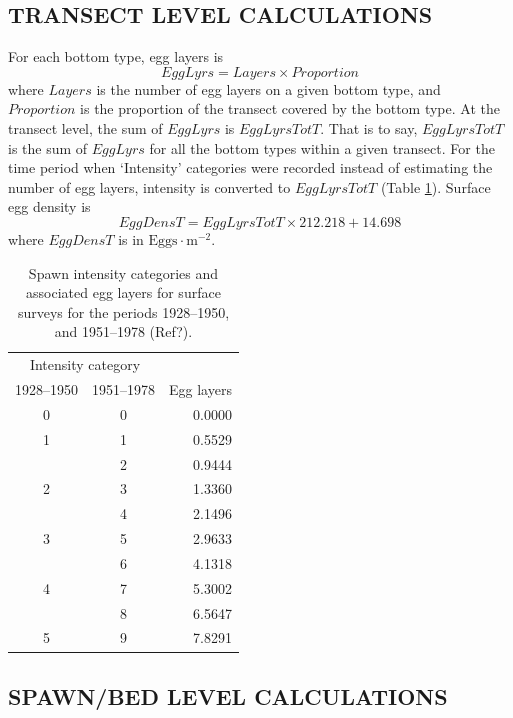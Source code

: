 \documentclass[12pt]{article}
\begin{document}
\subsection{TRANSECT LEVEL CALCULATIONS}

For each bottom type, egg layers is
\begin{equation}
EggLyrs = Layers \times Proportion
\label{eqEggLayersSurf}
\end{equation}
where $Layers$ is the number of egg layers on a given bottom type, and $Proportion$ is the proportion of the transect covered by the bottom type.
At the transect level, the sum of $EggLyrs$ is $EggLyrsTotT$.
That is to say, $EggLyrsTotT$ is the sum of $EggLyrs$ for all the bottom types within a given transect.
For the time period when `Intensity' categories were recorded instead of estimating the number of egg layers, intensity is converted to $EggLyrsTotT$ (Table \ref{tabIntensity}).
Surface egg density is \citep{SchweigertEtal1997}
\begin{equation}
EggDensT = EggLyrsTotT \times 212.218 + 14.698
\label{eqEggDensSurf}
\end{equation}
where $EggDensT$ is in $\text{Eggs} \cdot \text{m}^{-2}$. 

\begin{table}
\centering
\caption{Spawn intensity categories and associated egg layers for surface surveys for the periods 1928--1950, and 1951--1978 (Ref?).}
\begin{tabular}{ccr}
\toprule
\multicolumn{2}{c}{Intensity category} & \\
1928--1950 & 1951--1978 & Egg layers\\
\midrule
0 & 0 & 0.0000 \\
1 & 1 & 0.5529 \\
 & 2 & 0.9444 \\
2 & 3 & 1.3360 \\
 & 4 & 2.1496 \\
3 & 5 & 2.9633 \\
 & 6 & 4.1318 \\
4 & 7 & 5.3002 \\
 & 8 & 6.5647 \\
5 & 9 & 7.8291 \\
\bottomrule
\end{tabular}
\label{tabIntensity}
\end{table}

\subsection{SPAWN/BED LEVEL CALCULATIONS}
\end{document}
